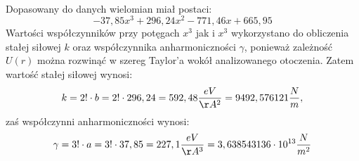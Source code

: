 \documentclass[12pt,a4paper]{article}
\begin{document}
\\
Dopasowany do danych wielomian miał postaci:
\begin{equation}
-37,85x^3+296,24x^2-771,46x+665,95
\end{equation}
Wartości współczynników przy potęgach $x^3$ jak i $x^3$ wykorzystano do obliczenia stałej siłowej $k$ oraz współczynnika anharmoniczności $\gamma$, ponieważ zależność $U(r)$ można rozwinąć w szereg Taylor'a wokół analizowanego otoczenia. 
Zatem wartość stałej siłowej wynosi:
\begin{equation}
k=2!\cdot b = 2!\cdot 296,24 = 592,48\frac{eV}{\AA^2} = 9492,576121 \frac{N}{m},
\end{equation}
zaś współczynni anharmoniczności wynosi:
\begin{equation}
\gamma = 3!\cdot a = 3! \cdot 37,85 = 227,1 \frac{eV}{\AA^3} = 3,638543136\cdot 10^{13} \frac{N}{m^2}
\end{equation}
\end{document}

